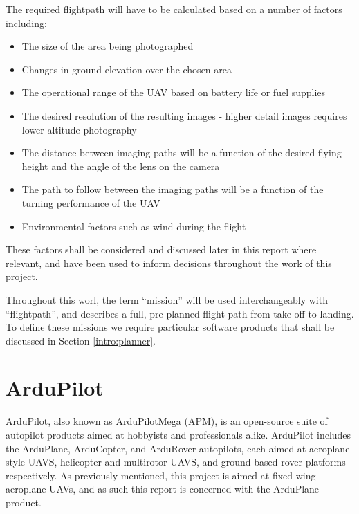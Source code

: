 The required flightpath will have to be calculated based on a number of factors including:
\begin{itemize}
	\item The size of the area being photographed
	\item Changes in ground elevation over the chosen area
	\item The operational range of the UAV based on battery life or fuel supplies
	\item The desired resolution of the resulting images - higher detail images requires lower altitude photography
	\item The distance between imaging paths will be a function of the desired flying height and the angle of the lens on the camera
	\item The path to follow between the imaging paths will be a function of the turning performance of the UAV
	\item Environmental factors such as wind during the flight
\end{itemize}

These factors shall be considered and discussed later in this report where relevant, and have been used to inform decisions throughout the work of this project.

Throughout this worl, the term ``mission'' will be used interchangeably with ``flightpath'', and describes a full, pre-planned flight path from take-off to landing. To define these missions we require particular software products that shall be discussed in Section \ref{intro:planner}.

\section{ArduPilot} 
\label{intro:ardupilot}

ArduPilot, also known as ArduPilotMega (APM), is an open-source suite of autopilot products aimed at hobbyists and professionals alike. ArduPilot includes the ArduPlane, ArduCopter, and ArduRover autopilots, each aimed at aeroplane style UAVS, helicopter and multirotor UAVS, and ground based rover platforms respectively. As previously mentioned, this project is aimed at fixed-wing aeroplane UAVs, and as such this report is concerned with the ArduPlane product. 

